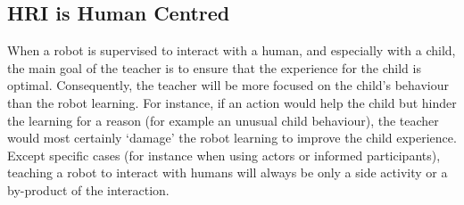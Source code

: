 
\subsection{HRI is Human Centred}

When a robot is supervised to interact with a human, and especially with a child, the main goal of the teacher is to ensure that the experience for the child is optimal. Consequently, the teacher will be more focused on the child's behaviour than the robot learning. For instance, if an action would help the child but hinder the learning for a reason (for example an unusual child behaviour), the teacher would most certainly `damage' the robot learning to improve the child experience. Except specific cases (for instance when using actors or informed participants), teaching a robot to interact with humans will always be only a side activity or a by-product of the interaction. 

